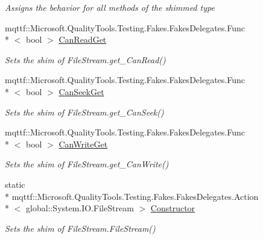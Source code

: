 \begin{DoxyCompactItemize}
\begin{DoxyCompactList}\small\item\em Assigns the behavior for all methods of the shimmed type\end{DoxyCompactList}\item 
mqttf\-::\-Microsoft.\-Quality\-Tools.\-Testing.\-Fakes.\-Fakes\-Delegates.\-Func\\*
$<$ bool $>$ \hyperlink{class_system_1_1_i_o_1_1_fakes_1_1_shim_file_stream_ae047b88b4470a23fc656c0cf26d45c45}{Can\-Read\-Get}
\begin{DoxyCompactList}\small\item\em Sets the shim of File\-Stream.\-get\-\_\-\-Can\-Read()\end{DoxyCompactList}\item 
mqttf\-::\-Microsoft.\-Quality\-Tools.\-Testing.\-Fakes.\-Fakes\-Delegates.\-Func\\*
$<$ bool $>$ \hyperlink{class_system_1_1_i_o_1_1_fakes_1_1_shim_file_stream_ab7b26ed4490da2968120bed9a9895a09}{Can\-Seek\-Get}
\begin{DoxyCompactList}\small\item\em Sets the shim of File\-Stream.\-get\-\_\-\-Can\-Seek()\end{DoxyCompactList}\item 
mqttf\-::\-Microsoft.\-Quality\-Tools.\-Testing.\-Fakes.\-Fakes\-Delegates.\-Func\\*
$<$ bool $>$ \hyperlink{class_system_1_1_i_o_1_1_fakes_1_1_shim_file_stream_a03f6ea8b91e9ee19468de7db6de8c439}{Can\-Write\-Get}
\begin{DoxyCompactList}\small\item\em Sets the shim of File\-Stream.\-get\-\_\-\-Can\-Write()\end{DoxyCompactList}\item 
static \\*
mqttf\-::\-Microsoft.\-Quality\-Tools.\-Testing.\-Fakes.\-Fakes\-Delegates.\-Action\\*
$<$ global\-::\-System.\-I\-O.\-File\-Stream $>$ \hyperlink{class_system_1_1_i_o_1_1_fakes_1_1_shim_file_stream_a4e55bb67dd9c03dd870ec5ffb21b1e74}{Constructor}
\begin{DoxyCompactList}\small\item\em Sets the shim of File\-Stream.\-File\-Stream()\end{DoxyCompactList}\item 

\end{DoxyCompactItemize}
